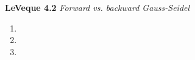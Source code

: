 \textbf{LeVeque 4.2} \textit{Forward vs. backward Gauss-Seidel}

\begin{enumerate}
  \item 
  \pagebreak
  \item 
  \pagebreak
  \item 
\end{enumerate} 